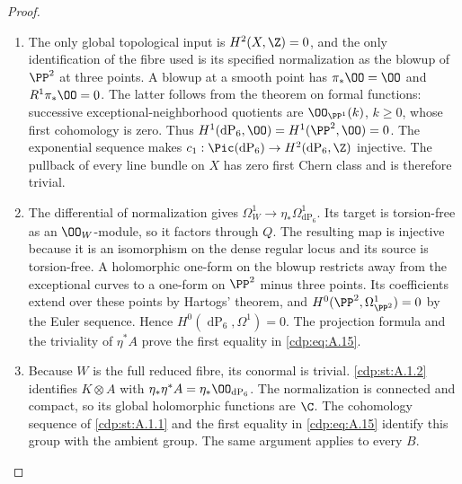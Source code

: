 \begin{proof}

\begin{enumerate}[label={$\langle1\rangle$\arabic*.},leftmargin=*]
\item The only global topological input is $H^2(X,\Z)=0$, and the only identification of the fibre used is its specified normalization as the blowup of $\PP^2$ at three points. A blowup at a smooth point has $\pi_*\OO=\OO$ and $R^1\pi_*\OO=0$. The latter follows from the theorem on formal functions: successive exceptional-neighborhood quotients are $\OO_{\PP^1}(k)$, $k\ge0$, whose first cohomology is zero. Thus $H^1(\operatorname{dP}_6,\OO)=H^1(\PP^2,\OO)=0$. The exponential sequence makes $c_1:\Pic(\operatorname{dP}_6)\to H^2(\operatorname{dP}_6,\Z)$ injective. The pullback of every line bundle on $X$ has zero first Chern class and is therefore trivial.

\item The differential of normalization gives $\Omega_W^1\to\eta_*\Omega^1_{\operatorname{dP}_6}$. Its target is torsion-free as an $\OO_W$-module, so it factors through $Q$. The resulting map is injective because it is an isomorphism on the dense regular locus and its source is torsion-free. A holomorphic one-form on the blowup restricts away from the exceptional curves to a one-form on $\PP^2$ minus three points. Its coefficients extend over these points by Hartogs' theorem, and $H^0(\PP^2,\Omega^1_{\PP^2})=0$ by the Euler sequence. Hence $H^0(\operatorname{dP}_6,\Omega^1)=0$. The projection formula and the triviality of $\eta^*A$ prove the first equality in \eqref{cdp:eq:A.15}.

\item Because $W$ is the full reduced fibre, its conormal is trivial. \ref{cdp:st:A.1.2} identifies $K\otimes A$ with $\eta_*\eta^*A=\eta_*\OO_{\operatorname{dP}_6}$. The normalization is connected and compact, so its global holomorphic functions are $\C$. The cohomology sequence of \ref{cdp:st:A.1.1} and the first equality in \eqref{cdp:eq:A.15} identify this group with the ambient group. The same argument applies to every $B$.

\end{enumerate}
\end{proof}
